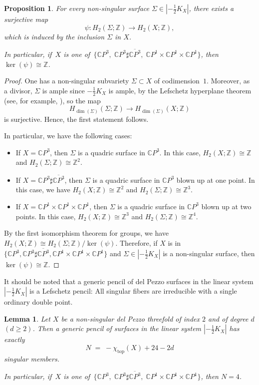 \documentclass[11pt]{amsart}
\numberwithin{equation}{section}
\theoremstyle{definition}
\theoremstyle{plain}
\newtheorem{proposition}[definition]{Proposition}
\newtheorem{lemma}[definition]{Lemma}
\theoremstyle{remark}
\newcommand{\Z}{\mathbb{Z}}
\newcommand{\C}{\mathbb{C}}
\newcommand{\lra}{\longrightarrow}
\begin{document}
\begin{proposition} \label{Prop-why.degree.is.678}
  For every non-singular surface $\Sigma\in |-\frac{1}{2}K_X|$, there exists a surjective map
  $$\psi \colon  H_2(\Sigma;\mathbb{Z})\lra H_2(X;\mathbb{Z}),$$
  which is induced by the inclusion $\Sigma$ in $X$.
 
In particular, if\,  $X$ is one of\, $\{\C P^3,\; \C P^3\sharp \overline{ \C P^3},\;\C P^1\times \C P^1 \times \C P^1\}$, then $\ker(\psi)\cong \mathbb{Z}$. 
\end{proposition}

\begin{proof}
  One has a non-singular subvariety $\Sigma \subset X$ of codimension~$1$. Moreover, as a divisor, $\Sigma$ is ample since $-\frac{1}{2}K_X$ is ample, by the Lefschetz hyperplane theorem (see, for example, \cite[Theorem C.8]{eisenbud20163264}), so the map
$$ H_{\dim(\Sigma)}(\Sigma;\mathbb{Z})\lra H_{\dim(\Sigma)}(X;\mathbb{Z})$$
is surjective. Hence, the first statement follows. 

In particular, we have the following cases: 
\begin{itemize}
\item If $X=\C P^3$, then $\Sigma$ is a quadric surface in $\C P^3$. In this case, $H_2(X;\mathbb{Z})\cong \Z$ and $H_2(\Sigma;\mathbb{Z})\cong \Z^2$.
\item If $X=\C P^3\sharp \overline{ \C P^3}$, then $\Sigma$ is a quadric surface in $\C P^3$ blown up at one point. In this case, we have $H_2(X;\mathbb{Z})\cong \Z^2$ and $H_2(\Sigma;\mathbb{Z})\cong \Z^3$.
\item If $X=\C P^1\times \C P^1 \times \C P^1$, then $\Sigma$ is a quadric surface in $\C P^3$ blown up at two points. In this case, $H_2(X;\mathbb{Z})\cong \Z^3$ and $H_2(\Sigma;\mathbb{Z})\cong \Z^4$.
\end{itemize}
By the first isomorphism theorem for groups, we have $H_2(X;\mathbb{Z})\cong H_2(\Sigma;\mathbb{Z})/\ker(\psi)$. Therefore, if  $X$ is in $\{\C P^3, \C P^3\sharp \overline{ \C P^3} ,\C P^1\times \C P^1 \times \C P^1\}$ and $\Sigma \in  |-\frac{1}{2}K_X|$ is a non-singular surface, then  $\ker(\psi)\cong\mathbb{Z}$. 
\end{proof}

It should be noted that a generic pencil of del Pezzo surfaces in the linear system $|-\frac{1}{2}K_X|$ is a 
 Lefschetz pencil: All singular fibers are irreducible with a single ordinary double point. 

\begin{lemma} \label{lem-4.singulars}
Let $X$ be a non-singular del Pezzo threefold of index $2$ and of degree $d$ $(d\geq 2)$.  
Then a generic pencil of surfaces in the linear system $|-\tfrac{1}{2}K_X|$ has exactly
\[
N \;=\;- \chi_{\mathrm{top}}(X)+24-2d
\]
singular members.  

In particular, if\,  $X$ is one of\, $\{\C P^3,\; \C P^3\sharp \overline{ \C P^3},\;\C P^1\times \C P^1 \times \C P^1\}$, then $N=4$.
\end{lemma}
\end{document}
